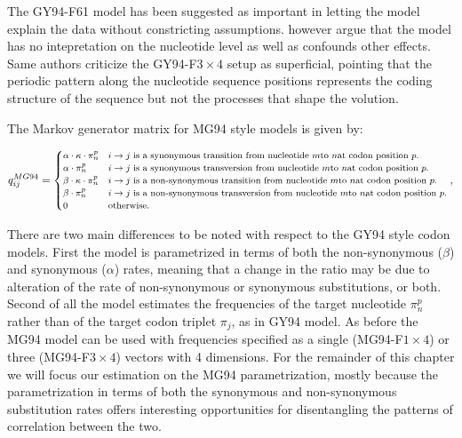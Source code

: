 The GY94-F61 model has been suggested as important in letting the model explain the data without constricting assumptions.
\citet{Rodrigue2008} however argue that the model has no intepretation on the nucleotide level as well as confounds other effects. 
Same authors criticize the GY94-F$3\times4$ setup as superficial, pointing that the periodic pattern along the nucleotide sequence positions represents the coding structure of the sequence but not the processes that shape the volution.

The Markov generator matrix for MG94 style models \citep{Muse1994} is given by:

\begin{equation}
\footnotesize{
q_{ij}^{MG94}=\begin{cases}
\alpha\cdot\kappa\cdot\pi_{n}^{p} & i\rightarrow j\text{ is a synonymous transition from nucleotide \ensuremath{m}to \ensuremath{n}at codon position \ensuremath{p}.}\\
\alpha\cdot\pi_{n}^{p} & i\rightarrow j\text{ is a synonymous transversion from nucleotide \ensuremath{m}to \ensuremath{n}at codon position \ensuremath{p}.}\\
\beta\cdot\kappa\cdot\pi_{n}^{p} & i\rightarrow j\text{ is a non-synonymous transition from nucleotide \ensuremath{m}to \ensuremath{n}at codon position \ensuremath{p}.}\\
\beta\cdot\pi_{n}^{p} & i\rightarrow j\text{ is a non-synonymous transversion from nucleotide \ensuremath{m}to \ensuremath{n}at codon position \ensuremath{p}.}\\
0 & \text{otherwise.}
\end{cases},
} %
\label{eq:mg94}
\end{equation}


There are two main differences to be noted with respect to the GY94 style codon models.
First the model is parametrized in terms of both the non-synonymous ($\beta$) and synonymous ($\alpha$) rates, meaning that a change in the ratio may be due to alteration of the rate of non-synonymous or synonymous substitutions, or both.
Second of all the model estimates the frequencies of the target nucleotide $\pi_{n}^{p}$ rather than of the target codon triplet $\pi_{j}$, as in GY94 model.
As before the MG94 model can be used with frequencies specified as a single (MG94-F$1\times4$) or three (MG94-F$3\times4$) vectors with 4 dimensions.
For the remainder of this chapter we will focus our estimation on the MG94 parametrization, mostly because the parametrization in terms of both the synonymous and non-synonymous substitution rates offers interesting opportunities for disentangling
the patterns of correlation between
the two.


